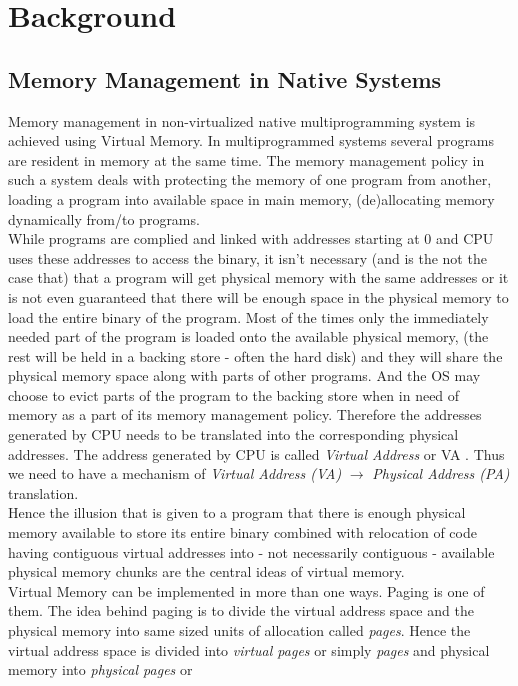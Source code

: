 \chapter{Background}

\section{Memory Management in Native Systems} \label{native}
Memory management in non-virtualized native multiprogramming system is achieved using Virtual
Memory. In multiprogrammed systems several programs are resident in memory at the same time.
The memory management policy in such a system deals with protecting the memory of one program from 
another, loading a program into available space in main memory, (de)allocating memory dynamically
from/to programs.\\
While programs are complied and linked with addresses starting at $0$ and CPU uses 
these addresses to access the binary, it isn't necessary (and is the not the case that) that a
program will get physical memory with the same addresses or it is not even guaranteed that there
will be enough space in the physical memory to load the entire binary of the program. Most of the
times only the immediately needed part of the program is loaded onto the available physical
memory, (the rest will be held in a backing store - often the hard disk) and they will share the
physical memory space along with parts of other programs. And the OS may choose to evict parts of
the program to the backing store when in need of memory as a part of its memory management policy.
Therefore the addresses generated by CPU needs to be translated into the corresponding physical
addresses. The address generated by CPU is called \textit{Virtual Address} or VA . Thus we need to
have a mechanism of \textit{Virtual Address (VA)} $\rightarrow$ \textit{Physical Address (PA)}
translation.\\
Hence the illusion that is given to a program that there is enough physical memory available to
store its entire binary combined with relocation of code having contiguous virtual addresses into
- not necessarily contiguous - available physical memory chunks are the central ideas of virtual
memory.\\
Virtual Memory can be implemented in more than one ways. Paging is one of them. The idea behind
paging is to divide the virtual address space and the physical memory into same sized units of
allocation called \textit{pages}. Hence the virtual address space is divided into \textit{virtual
pages} or simply \textit{pages} and physical memory into \textit{physical pages} or
